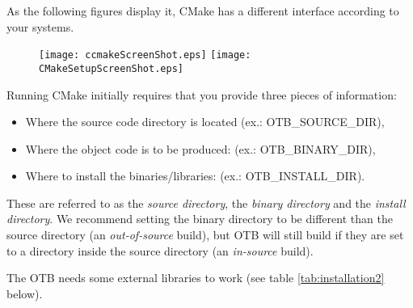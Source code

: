 As the following figures display it, CMake has a different interface according to your systems.
\label{sec:ConfiguringOTBwithVTK}

\begin{figure}[tpb]
\centering
\texttt{[image: ccmakeScreenShot.eps]}
\texttt{[image: CMakeSetupScreenShot.eps]}
\label{fig:CMakeGUI}
\end{figure}




Running CMake initially requires that you provide three pieces of
information:
\begin{itemize}
\item Where the source code directory is located (ex.: OTB\_SOURCE\_DIR),
\item Where the object code is to be produced: (ex.: OTB\_BINARY\_DIR),
\item Where to install the binaries/libraries: (ex.: OTB\_INSTALL\_DIR).
\end{itemize}
These are referred to as the \emph{source directory}, the \emph{binary directory} and the \emph{install directory}.
We recommend setting the binary directory to be different than the source directory (an
\emph{out-of-source} build), but OTB will still build if they are set
to a directory inside the source directory (an \emph{in-source} build).


The OTB needs some external libraries to work (see table \ref{tab:installation2} below). 

